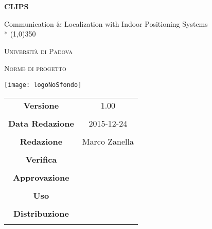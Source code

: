 \documentclass[a4paper]{article}
\begin{document}
	\begin{titlepage} 
		\centering
		{\huge\bfseries CLIPS\par}
		Communication \& Localization with Indoor Positioning Systems \\*
		\line(1,0){350} \\
		{\scshape\LARGE Universit\`a{} di Padova \par}
		\vspace{1cm}
		{\scshape\Large Norme di progetto\par}
		\vspace{2cm}
		\begin{center}
		{\texttt{[image: logoNoSfondo]} \par}
		\end{center}
		\vfill \vfill
		\begin{tabular}{c|c}
			{\hfill \textbf{Versione}} 			& 1.00			\\ \\
			{\hfill\textbf{Data Redazione}} 		& 2015-12-24  		\\ \\
			{\hfill\textbf{Redazione}} 			&  Marco Zanella      \\ \\
			{\hfill\textbf{Verifica}} 				&  \\ \\
			{\hfill\textbf{Approvazione}} 		&  \\ \\
			{\hfill\textbf{Uso}} 					& \\ \\
			{\hfill\textbf{Distribuzione}} 			& \\ \\
		\end{tabular}
	\end{titlepage}
\pagestyle{mymain}

\glsaddall
\printglossary[style=indexgroup, nonumberlist]
\label{LastPage}
\end{document}
